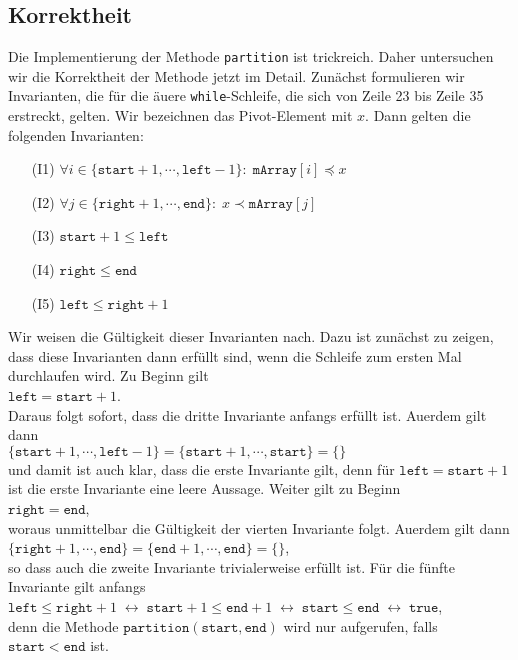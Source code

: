 \subsection{Korrektheit}
Die Implementierung der Methode \texttt{partition} ist trickreich.  Daher untersuchen wir
die Korrektheit der Methode jetzt im Detail.  Zun\"achst formulieren wir Invarianten, die
f\"ur die \"au\3ere \texttt{while}-Schleife, die sich von Zeile 23 bis Zeile 35 erstreckt,
gelten.   Wir bezeichnen das Pivot-Element mit $x$.  Dann gelten die folgenden Invarianten:
\begin{enumerate}
\item[(I1)] $\forall i \in \{ \mathtt{start}+1, \cdots, \mathtt{left} - 1 \} \colon\; \mathtt{mArray}[i] \preceq x$
\item[(I2)] $\forall j \in \{ \mathtt{right}+1, \cdots, \mathtt{end} \} \colon\; x \prec \mathtt{mArray}[j]$
\item[(I3)] $\mathtt{start}+1 \leq \mathtt{left}$ 
\item[(I4)] $\mathtt{right} \leq \mathtt{end}$ 
\item[(I5)] $\mathtt{left} \leq \mathtt{right} + 1$
\end{enumerate}
Wir weisen die G\"ultigkeit dieser Invarianten nach.  Dazu ist zun\"achst zu zeigen,
dass diese Invarianten dann erf\"ullt sind, wenn die Schleife zum ersten Mal durchlaufen wird.
Zu Beginn gilt \\[0.2cm]
\hspace*{1.3cm} $\texttt{left} = \mathtt{start} + 1$. \\[0.2cm]
Daraus folgt sofort, dass die dritte Invariante anfangs erf\"ullt ist.  Au\3erdem gilt dann \\[0.2cm]
\hspace*{1.3cm} 
$\{ \mathtt{start}+1, \cdots, \mathtt{left}-1 \} = \{ \mathtt{start}+1, \cdots, \mathtt{start} \} = \{\}$
\\[0.2cm]
und damit ist auch klar, dass die erste Invariante gilt, denn f\"ur $\mathtt{left} = \mathtt{start}+1$
ist die erste Invariante eine leere Aussage.  Weiter gilt zu Beginn \\[0.2cm]
\hspace*{1.3cm} $\mathtt{right} = \mathtt{end}$,
\\[0.2cm]
woraus unmittelbar die G\"ultigkeit der vierten Invariante folgt.  Au\3erdem gilt dann \\[0.2cm]
\hspace*{1.3cm} 
$\{ \mathtt{right}+1, \cdots, \mathtt{end} \} = \{ \mathtt{end}+1, \cdots, \mathtt{end} \} = \{\}$,
\\[0.2cm]
so dass auch die zweite Invariante trivialerweise erf\"ullt ist.  F\"ur die f\"unfte Invariante gilt anfangs
 \\[0.2cm]
\hspace*{1.3cm} 
$\mathtt{left} \leq \mathtt{right} + 1 \;\leftrightarrow\; \mathtt{start} + 1 \leq \mathtt{end} + 1 \;\leftrightarrow\;
  \mathtt{start} \leq \mathtt{end} \;\leftrightarrow\; \mathtt{true}$,
\\[0.2cm]
denn die Methode $\texttt{partition}(\texttt{start}, \texttt{end})$ wird nur aufgerufen,
falls $\mathtt{start} < \mathtt{end}$ ist.
\vspace*{0.3cm}

